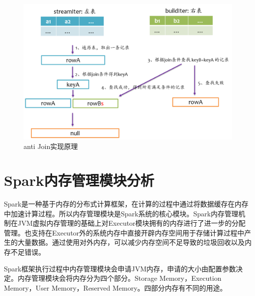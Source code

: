\begin{figure}[htbp]
    \centering
    \includegraphics[width=1\textwidth]{Img/spark-sql-anti-join.png}
    \caption{anti Join实现原理}
    \label{fig:anti-join}
\end{figure}

\section{Spark内存管理模块分析}

Spark是一种基于内存的分布式计算框架，在计算的过程中通过将数据缓存在内存中加速计算过程。所以内存管理模块是Spark系统的核心模块。Spark内存管理机制在JVM虚拟内存管理的基础上对Executor模块拥有的内存进行了进一步的分配管理。也支持在Executor外的系统内存中直接开辟内存空间用于存储计算过程中产生的大量数据。通过使用对外内存，可以减少内存空间不足导致的垃圾回收以及内存不足错误。

Spark框架执行过程中内存管理模块会申请JVM内存，申请的大小由配置参数决定。内存管理模块会将内存分为四个部分。Storage Memory，Execution Memory，User Memory，Reserved Memory。四部分内存有不同的用途。

